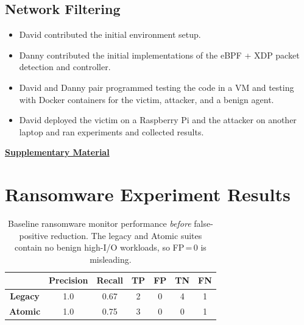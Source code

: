 \documentclass[twocolumn, 10pt]{scrartcl}
\begin{document}
\subsection{Network Filtering}
\begin{itemize}
    \item David contributed the initial environment setup. 
    \item Danny contributed the initial implementations of the eBPF + XDP packet detection and controller. 
    \item David and Danny pair programmed testing the code in a VM and testing with Docker containers for the victim, attacker, and a benign agent. 
    \item David deployed the victim on a Raspberry Pi and the attacker on another laptop and ran experiments and collected results.
\end{itemize}  

\clearpage



\clearpage
\appendix
{\Large\begin{center}\underline{\textbf{Supplementary Material}}\end{center}}
\section{Ransomware Experiment Results}
    \begin{table}[!ht]
        \centering
        \begin{tabular}{|c|c|c|c|c|c|c|}
        \hline
             & \textbf{Precision} & \textbf{Recall} & \textbf{TP} & \textbf{FP} & \textbf{TN} & \textbf{FN} \\ \hline
            \textbf{Legacy} & 1.0 &  0.67 & 2 & 0 & 4 & 1\\ \hline
            \textbf{Atomic} & 1.0 & 0.75 & 3 & 0 & 0 & 1 \\ \hline 
        \end{tabular}
        \caption{Baseline ransomware monitor performance \emph{before} false-positive reduction. The legacy and Atomic suites contain no benign high-I/O workloads, so FP\,=\,0 is misleading.}
        \label{tab:evalransom}
    \end{table}
\end{document}
